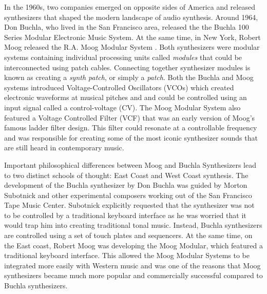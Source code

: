 In the 1960s, two companies emerged on opposite sides of America and released synthesizers that shaped the modern landscape of audio synthesis. Around 1964, Don Buchla, who lived in the San Francisco area, released the the Buchla 100 Series Modular Electronic Music System. At the same time, in New York, Robert Moog released the R.A. Moog Modular System \cite{mcguire2015musical}. Both synthesizers were modular systems containing individual processing units called \textit{modules} that could be interconnected using patch cables. Connecting together synthesizer modules is known as creating a \textit{synth patch}, or simply a \textit{patch}. Both the Buchla and Moog systems introduced Voltage-Controlled Oscillators (VCOs) which created electronic waveforms at musical pitches and and could be controlled using an input signal called a control-voltage (CV). The Moog Modular System also featured a Voltage Controlled Filter (VCF) that was an early version of Moog's famous ladder filter design. This filter could resonate at a controllable frequency and was responsible for creating some of the most iconic synthesizer sounds that are still heard in contemporary music.

Important philosophical differences between Moog and Buchla Synthesizers lead to two distinct schools of thought: East Coast and West Coast synthesis. The development of the Buchla synthesizer by Don Buchla was guided by Morton Subotnick and other experimental composers working out of the San Francisco Tape Music Center. Subotnick explicitly requested that the synthesizer was not to be controlled by a traditional keyboard interface as he was worried that it would trap him into creating traditional tonal music. Instead, Buchla synthesizers are controlled using a set of touch plates and sequencers. At the same time, on the East coast, Robert Moog was developing the Moog Modular, which featured a traditional keyboard interface. This allowed the Moog Modular Systems to be integrated more easily with Western music and was one of the reasons that Moog synthesizers became much more popular and commercially successful compared to Buchla synthesizers. 

